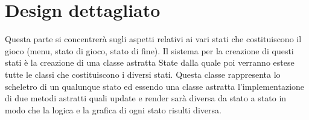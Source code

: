 \documentclass[a4paper,12pt]{report}
\begin{document}
    \section{Design dettagliato}
    \par Questa parte si concentrerà sugli aspetti relativi ai vari stati che costituiscono il gioco (menu, stato di gioco, stato di fine).
     Il sistema per la creazione di questi stati è la creazione di una classe astratta State dalla quale poi verranno
     estese tutte le classi che costituiscono i diversi stati. Questa classe rappresenta lo scheletro di un qualunque
     stato ed essendo una classe astratta l’implementazione di due metodi astratti quali update e render sarà diversa da
     stato a stato in modo che la logica e la grafica di ogni stato risulti diversa.
    \\
    \\
    \par
\end{document}
